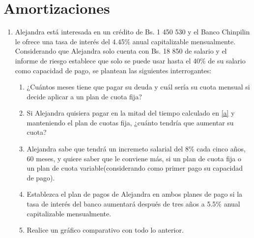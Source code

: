 \documentclass{article}
\begin{document}
\section{Amortizaciones}
    \begin{enumerate}
        \item Alejandra está interesada en un crédito de Bs. 1 450 530 y el Banco Chinpilin le ofrece una tasa de interés del 4.45\% anual capitalizable mensualmente. Considerando que Alejandra solo cuenta con Bs. 18 850 de salario y el informe de riesgo establece que solo se puede usar hasta el 40\% de su salario como capacidad de pago, se plantean las siguientes interrogantes:
        \begin{enumerate}
            \item ¿Cuántos meses tiene que pagar su deuda y cuál sería su cuota mensual si decide aplicar a un plan de cuota fija?\label{a}
            \item Si Alejandra quisiera pagar en la mitad del tiempo calculado en \ref{a} y manteniendo el plan de cuotas fija, ¿cuánto tendría que aumentar su cuota?
            \item Alejandra sabe que tendrá un incremeto salarial del 8\% cada cinco años, 60 meses, y quiere saber que le conviene más, si un plan de cuota fija o un plan de cuota variable(considerando como primer pago su capacidad de pago).
            \item Establezca el plan de pagos de Alejandra en ambos planes de pago si la tasa de interés del banco aumentará después de tres años a 5.5\% anual capitalizable mensualmente.
            \item Realice un gráfico comparativo con todo lo anterior.
        \end{enumerate}
    \end{enumerate}
\end{document}
